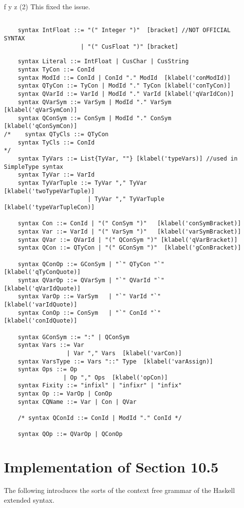 f y z (2)
This fixed the issue.
\begin{lstlisting}

    syntax IntFloat ::= "(" Integer ")"  [bracket] //NOT OFFICIAL SYNTAX
                      | "(" CusFloat ")" [bracket]
\end{lstlisting}
\begin{lstlisting}
    syntax Literal ::= IntFloat | CusChar | CusString
    syntax TyCon ::= ConId
    syntax ModId ::= ConId | ConId "." ModId  [klabel('conModId)]
    syntax QTyCon ::= TyCon | ModId "." TyCon [klabel('conTyCon)]
    syntax QVarId ::= VarId | ModId "." VarId [klabel('qVarIdCon)]
    syntax QVarSym ::= VarSym | ModId "." VarSym  [klabel('qVarSymCon)]
    syntax QConSym ::= ConSym | ModId "." ConSym  [klabel('qConSymCon)]
/*    syntax QTyCls ::= QTyCon
    syntax TyCls ::= ConId
*/
    syntax TyVars ::= List{TyVar, ""} [klabel('typeVars)] //used in SimpleType syntax
    syntax TyVar ::= VarId
    syntax TyVarTuple ::= TyVar "," TyVar      [klabel('twoTypeVarTuple)]
                        | TyVar "," TyVarTuple [klabel('typeVarTupleCon)]

    syntax Con ::= ConId | "(" ConSym ")"   [klabel('conSymBracket)]
    syntax Var ::= VarId | "(" VarSym ")"   [klabel('varSymBracket)]
    syntax QVar ::= QVarId | "(" QConSym ")" [klabel('qVarBracket)]
    syntax QCon ::= QTyCon | "(" GConSym ")"  [klabel('gConBracket)]

    syntax QConOp ::= GConSym | "`" QTyCon "`"    [klabel('qTyConQuote)]
    syntax QVarOp ::= QVarSym | "`" QVarId "`"    [klabel('qVarIdQuote)]
    syntax VarOp ::= VarSym   | "`" VarId "`"     [klabel('varIdQuote)]
    syntax ConOp ::= ConSym   | "`" ConId "`"     [klabel('conIdQuote)]

    syntax GConSym ::= ":" | QConSym
    syntax Vars ::= Var
                  | Var "," Vars  [klabel('varCon)]
    syntax VarsType ::= Vars "::" Type  [klabel('varAssign)]
    syntax Ops ::= Op
                 | Op "," Ops  [klabel('opCon)]
    syntax Fixity ::= "infixl" | "infixr" | "infix"
    syntax Op ::= VarOp | ConOp
    syntax CQName ::= Var | Con | QVar

    /* syntax QConId ::= ConId | ModId "." ConId */

    syntax QOp ::= QVarOp | QConOp
\end{lstlisting}

\section{Implementation of Section 10.5}
The following introduces the sorts of the context free grammar of the Haskell extended syntax.

